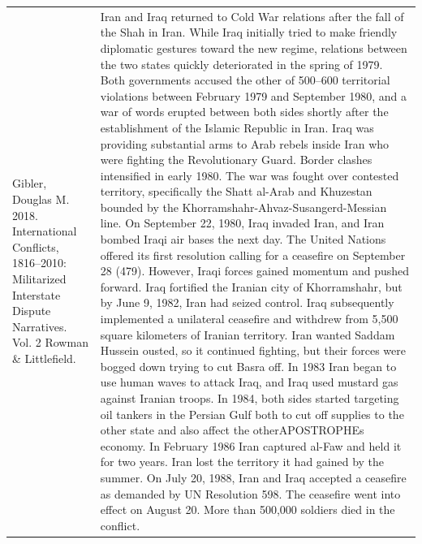 {\begin{longtable}{p{}p{}}
Gibler, Douglas M. 2018. International Conflicts, 1816–2010: Militarized Interstate Dispute Narratives. Vol. 2 Rowman \& Littlefield. & Iran and Iraq returned to Cold War relations after the fall of the Shah in Iran. While Iraq initially tried to make friendly diplomatic gestures toward the new regime, relations between the two states quickly deteriorated in the spring of 1979. Both governments accused the other of 500–600 territorial violations between February 1979 and September 1980, and a war of words erupted between both sides shortly after the establishment of the Islamic Republic in Iran. Iraq was providing substantial arms to Arab rebels inside Iran who were fighting the Revolutionary Guard. Border clashes intensified in early 1980. The war was fought over contested territory, specifically the Shatt al-Arab and Khuzestan bounded by the Khorramshahr-Ahvaz-Susangerd-Messian line. On September 22, 1980, Iraq invaded Iran, and Iran bombed Iraqi air bases the next day. The United Nations offered its first resolution calling for a ceasefire on September 28 (479). However, Iraqi forces gained momentum and pushed forward. Iraq fortified the Iranian city of Khorramshahr, but by June 9, 1982, Iran had seized control. Iraq subsequently implemented a unilateral ceasefire and withdrew from 5,500 square kilometers of Iranian territory. Iran wanted Saddam Hussein ousted, so it continued fighting, but their forces were bogged down trying to cut Basra off. In 1983 Iran began to use human waves to attack Iraq, and Iraq used mustard gas against Iranian troops. In 1984, both sides started targeting oil tankers in the Persian Gulf both to cut off supplies to the other state and also affect the otherAPOSTROPHEs economy. In February 1986 Iran captured al-Faw and held it for two years. Iran lost the territory it had gained by the summer. On July 20, 1988, Iran and Iraq accepted a ceasefire as demanded by UN Resolution 598. The ceasefire went into effect on August 20. More than 500,000 soldiers died in the conflict.
\\

\end{longtable}}
